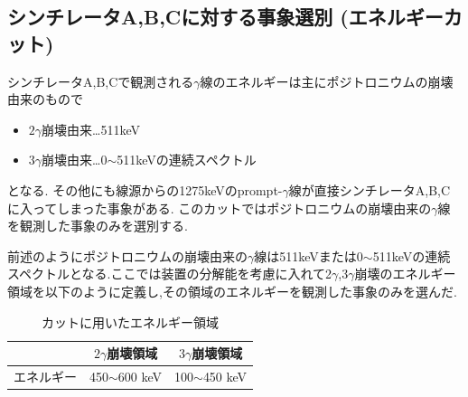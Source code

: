 \subsection{シンチレータA,B,Cに対する事象選別 (エネルギーカット)}
シンチレータA,B,Cで観測される$\gamma$線のエネルギーは主にポジトロニウムの崩壊由来のもので
\begin{itemize}
		\item $2\gamma$崩壊由来…511keV
		\item $3\gamma$崩壊由来…0$\sim$511keVの連続スペクトル
\end{itemize}
となる.
その他にも線源からの1275keVのprompt-$\gamma$線が直接シンチレータA,B,Cに入ってしまった事象がある.
このカットではポジトロニウムの崩壊由来の$\gamma$線を観測した事象のみを選別する.

前述のようにポジトロニウムの崩壊由来の$\gamma$線は511keVまたは0$\sim$511keVの連続スペクトルとなる.ここでは装置の分解能を考慮に入れて2$\gamma$,3$\gamma$崩壊のエネルギー領域を以下のように定義し,その領域のエネルギーを観測した事象のみを選んだ.
\begin{table}[htbp]
	\begin{center}
		\caption{カットに用いたエネルギー領域}
		\begin{tabular}{|l|c|c|} \hline
			 & $2\gamma$崩壊領域 & $3\gamma$崩壊領域 \\ \hline
			エネルギー & 450$\sim$600 keV & 100$\sim$450 keV\\ \hline
		\end{tabular}
		\label{energy_cut_region}
	\end{center}
\end{table}


